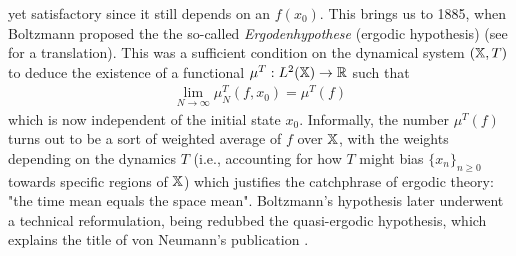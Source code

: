 \documentclass[11pt]{report}
\theoremstyle{definition}
\begin{document}
    yet satisfactory since it still depends on an $f(x_0)$. This brings us to
    1885, when Boltzmann proposed the the so-called \textit{Ergodenhypothese}
    (ergodic hypothesis) \cite{Hasenöhrl_Boltzmann_2012} (see
    \cite{Boltzmann_2019} for a translation). This was a sufficient condition on
    the dynamical system $(\mathbb{X},T)$ to deduce the existence of a functional
    $\mu^T:L^2(\mathbb{X})\rightarrow\mathbb{R}$ such that
    \begin{align}
        \lim_{N\rightarrow\infty}\mu_N^T(f,x_0)=\mu^T(f)\label{eq2}
    \end{align}
    which is now independent of the initial state $x_0$. Informally, the number
    $\mu^T(f)$ turns out to be a sort of weighted average of $f$ over $\mathbb{X}$,
    with the weights depending on the dynamics $T$ (i.e., accounting for how $T$
    might bias $\{x_n\}_{n\geq 0}$ towards specific regions of $\mathbb{X}$) which
    justifies the catchphrase of ergodic theory: "the time mean equals the space
    mean". Boltzmann's hypothesis later underwent a technical reformulation,
    being redubbed the quasi-ergodic hypothesis, which explains the title of von
    Neumann's publication \cite{Neumann_1932}. 
\end{document}
